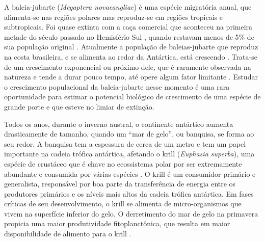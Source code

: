 \documentclass[12pt, A4]{article}
\begin{document}
A baleia-jubarte (\emph{Megaptera novaeangliae}) é uma espécie
migratória anual, que alimenta-se nas regiões polares mas reproduz-se
em regiões tropicais e subtropicais. Foi quase extinta com a caça comercial
que aconteceu na primeira metade do século passado no Hemisfério Sul
\citep{findlay2001}, quando restavam menos de 5\% de sua população
original \citep{clapham1999}. Atualmente a população de
baleias-jubarte que reproduz na costa brasileira, e se alimenta ao
redor da Antártica, está crescendo \citep{ward2006}. Trata-se de um
crescimento exponencial ou próximo dele, que é raramente observada na
natureza e tende a durar pouco tempo, até opere algum fator
limitante \citep{rockwood2006}. Estudar o crescimento populacional da
baleia-jubarte nesse momento é uma rara oportunidade para estimar o
potencial biológico de crescimento de uma espécie de grande porte e
que esteve no limiar de extinção.

Todos os anos, durante o inverno austral, o continente antártico
aumenta drasticamente de tamanho, quando um ``mar de gelo'', ou
banquisa, se forma ao seu redor. A banquisa tem
a espessura de cerca de um metro e tem um papel importante na cadeia
trófica antártica, afetando o krill (\emph{Euphasia superba}), uma espécie de
crustáceo que é chave no ecossistema polar por ser extremamente abundante
e consumida por várias espécies \citep{everton2000}. O krill é um
consumidor primário e generalista, responsável por boa parte da
transferência de energia entre os produtores primários e os níveis
mais altos da cadeia trófica antártica. Em fases críticas de seu
desenvolvimento, o krill se alimenta de
micro-organismos que vivem na superfície inferior do gelo. 
O derretimento do mar de gelo na primavera propicia uma maior
produtividade fitoplanctônica, que resulta em maior disponibilidade de
alimento para o krill \citep{nicol2006}.
\end{document}

